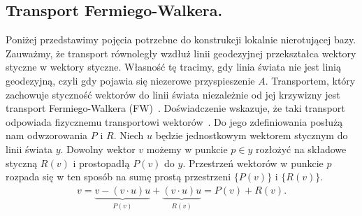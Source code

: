 \subsection{Transport Fermiego-Walkera.}
Poniżej przedstawimy pojęcia potrzebne do konstrukcji lokalnie 
nierotującej bazy. 
Zauważmy, że transport równoległy wzdłuż linii geodezyjnej
przekształca wektory styczne w wektory styczne. Własność tę 
tracimy, gdy linia świata nie jest linią geodezyjną, czyli
gdy pojawia się niezerowe przyspieszenie $A$. 
Transportem, który zachowuje styczność 
wektorów do linii świata niezależnie od jej krzywizny jest transport 
Fermiego-Walkera (FW)~\cite{synge1960}.
Doświadczenie wskazuje, że taki transport odpowiada 
fizycznemu transportowi wektorów~\cite{Costa2015, Ashtekar20141}.
Do jego zdefiniowania posłużą nam odwzorowania $P$ i $R$.
Niech $u$ będzie jednostkowym
wektorem stycznym do linii świata $y$. Dowolny wektor $v$ możemy w punkcie 
$p\in y$ rozłożyć na składowe styczną $R(v)$ i prostopadłą $P(v)$ 
do $y$. Przestrzeń wektorów w punkcie $p$ rozpada się w ten sposób 
na sumę prostą przestrzeni $\{P(v)\}$ i $\{R(v)\}$.
\begin{align}\nonumber %
v = \underbrace{v - (v\cdot u) u}_{P(v)} + 
\underbrace{(v\cdot u)u}_{R(v)} = P(v) + R(v).
\end{align}

